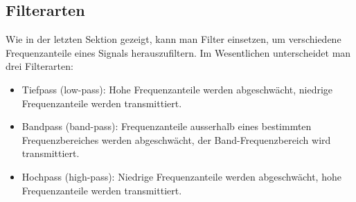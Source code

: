     


\subsection{Filterarten}
\label{subsec:vl10-2}

Wie in der letzten Sektion gezeigt, kann man Filter einsetzen, um verschiedene Frequenzanteile eines Signals herauszufiltern. Im Wesentlichen unterscheidet man drei Filterarten:
\begin{itemize}
\setlength\itemsep{0em}
    \item Tiefpass (low-pass): Hohe Frequenzanteile werden abgeschw\"acht, niedrige Frequenzanteile werden transmittiert.
    \item Bandpass (band-pass): Frequenzanteile ausserhalb eines bestimmten Frequenzbereiches werden abgeschw\"acht, der Band-Frequenzbereich wird transmittiert.
    \item Hochpass (high-pass): Niedrige Frequenzanteile werden abgeschw\"acht, hohe Frequenzanteile werden transmittiert.
\end{itemize}

